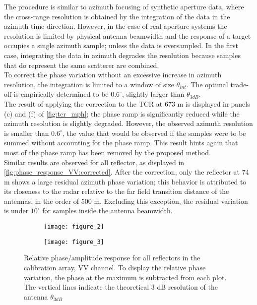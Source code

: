 The procedure is similar to azimuth focusing of synthetic aperture data, where the cross-range resolution is obtained by the integration of the data in the azimuth-time direction. However, in the case of real aperture systems the resolution is limited by physical antenna beamwidth and the response of a target  occupies a single azimuth sample; unless the data is oversampled. In the first case, integrating the data in azimuth degrades the resolution because samples that do represent the same scatterer are combined.\\ To correct the phase variation without an excessive increase in azimuth resolution, the integration is limited to a window of size $\theta_{int}$. The optimal trade-off is empirically determined to be $0.6^\circ$, slightly larger than $\theta_{3dB}$.\\
The result of applying the correction to the TCR at 673 m is displayed in panels (c) and (f) of \autoref{fig:tcr_mph}; the phase ramp is significantly reduced while the azimuth resolution is slightly degraded. However, the observed azimuth resolution is smaller than $0.6^\circ$, the value that would be observed if the samples were to be summed without accounting for the phase ramp. This result hints again that  most of the phase ramp has been removed by the proposed method.\\
Similar results are observed for all reflector, as displayed in 	\autoref{fig:phase_response_VV:corrected}.  After the correction, only the reflector at 74 m shows a large residual azimuth phase variation; this behavior is attributed to its closeness to the radar relative to the far field transition distance of the antennas, in the order of 500 m. Excluding this exception, the residual variation is under $10^\circ$ for samples inside the antenna beamwidth.
\begin{figure*}[ht]
	\begin{subfigure}[t]{\columnwidth}
		\texttt{[image: figure\_2]}
		\label{fig:phase_response_VV:uncorrected}
	\end{subfigure}
	\begin{subfigure}[t]{\columnwidth}
		\texttt{[image: figure\_3]}
		\label{fig:phase_response_VV:corrected}
	\end{subfigure}
	\caption{Relative phase/amplitude response for all reflectors in the calibration array, VV channel. To display the relative phase variation, the phase at the maximum is subtracted from each plot. The vertical lines indicate the theoretical 3 dB resolution of the antenna $\theta_{3dB}$}
	\label{fig:phase_response_VV}
\end{figure*}


